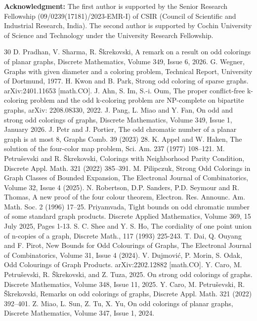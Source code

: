\documentclass[12pt,a4paper]{article}
\theoremstyle{definition}
\numberwithin{equation}{section}
\begin{document}
\vspace{0.5cm}
\noindent \textbf{Acknowledgment:} The first author is supported by the Senior Research Fellowship (09/0239(17181)/2023-EMR-I) of CSIR (Council of Scientific and Industrial Research, India). The second author is supported by Cochin University of Science and Technology under the University Research Fellowship.

\begin{thebibliography}{30}
 D. Pradhan, V. Sharma, R. Škrekovski, A remark on a result on odd colorings of planar graphs, Discrete Mathematics, Volume 349, Issue 6, 2026.
 G. Wegner, Graphs with given diameter and a coloring problem, Technical Report, University of Dortmund, 1977.
 H. Kwon and B. Park, Strong odd coloring of sparse graphs. arXiv:2401.11653 [math.CO].
 J. Ahn, S. Im, S.-i. Oum, The proper conflict-free k-coloring problem and the odd k-coloring problem are NP-complete on bipartite graphs, arXiv: 2208.08330, 2022.
 J. Pang, L. Miao and Y. Fan, On odd and strong odd colorings of graphs, Discrete Mathematics, Volume 349, Issue 1, January 2026.
 J. Petr and J. Portier, The odd chromatic number of a planar graph is at most 8, Graphs Comb. 39 (2023) 28.
 K. Appel and W. Haken, The solution of the four-color map problem, Sci. Am. 237 (1977) 108--121.
 M. Petruševski and R. Škrekovski, Colorings with Neighborhood Parity Condition, Discrete Appl. Math. 321 (2022) 385--391.
 M. Pilipczuk, Strong Odd Colorings in Graph Classes of Bounded Expansion, The Electronal Journal of Combinatorics, Volume 32, Issue 4 (2025). 
 N. Robertson, D.P. Sanders, P.D. Seymour and R. Thomas, A new proof of the four colour theorem, Electron. Res. Announc. Am. Math. Soc. 2 (1996) 17--25.
 Priyamvada, Tight bounds on odd chromatic number of some standard graph products. Discrete Applied Mathematics, Volume 369, 15 July 2025, Pages 1-13.
 S. C. Shee and Y. S. Ho, The cordiality of one point union of n-copies of a graph, Discrete Math., 117 (1993) 225-243.
 T. Dai, Q. Ouyang and F. Pirot, New Bounds for Odd Colourings of Graphs, The Electronal Journal of Combinatorics, Volume 31, Issue 4 (2024).
 V. Dujmović, P. Morin, S. Odak, Odd Colourings of Graph Products. arXiv:2202.12882 [math.CO]. 
 Y. Caro, M. Petruševski, R. Škrekovski, and Z. Tuza, 2025. On strong odd colorings of graphs. Discrete Mathematics, Volume 348, Issue 11, 2025.
 Y. Caro, M. Petruševski, R. Škrekovski, Remarks on odd colorings of graphs, Discrete Appl. Math. 321 (2022) 392--401.
 Z. Miao, L. Sun, Z. Tu, X. Yu, On odd colorings of planar graphs, Discrete Mathematics, Volume 347, Issue 1, 2024.

\end{thebibliography}
\end{document}
